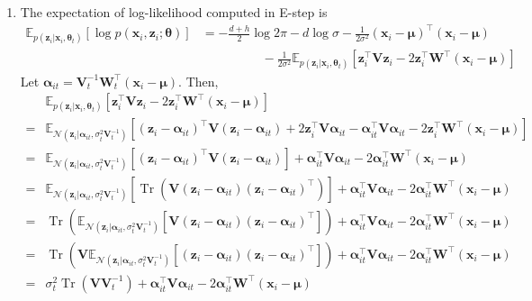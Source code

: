 \documentclass[11pt]{article}
\DeclareMathOperator{\tr}{Tr}
\begin{document}
\begin{enumerate}
\begin{enumerate}
    \item
    The expectation of log-likelihood computed in E-step is
    \begin{align*}
    \mathbb{E}_{p(\bm z_i|\bm x_i,\bm\theta_t)}[\log p(\bm x_i,\bm z_i;\bm\theta)]
    &= -\frac{d+h}{2}\log 2\pi-d\log\sigma-\frac{1}{2\sigma^2}(\bm x_i-\bm\mu)^{\top}(\bm x_i-\bm\mu) \\
    &\hspace{2cm} -\frac{1}{2\sigma^2}\mathbb{E}_{p(\bm z_i|\bm x_i,\bm\theta_t)}\left[\bm z_i^{\top}\bm V\bm z_i-2\bm z_i^{\top}\bm W^{\top}(\bm x_i-\bm\mu)\right]
    \end{align*}
    Let $\bm\alpha_{it}=\bm V_t^{-1}\bm W_t^{\top}(\bm x_i-\bm\mu)$. Then,
    \begin{align*}
    & \mathbb{E}_{p(\bm z_i|\bm x_i,\bm\theta_t)}\left[\bm z_i^{\top}\bm V\bm z_i-2\bm z_i^{\top}\bm W^{\top}(\bm x_i-\bm\mu)\right] \\
    =& \mathbb{E}_{\mathcal{N}(\bm z_i|\bm\alpha_{it},\sigma_t^2\bm V_t^{-1})}\left[(\bm z_i-\bm\alpha_{it})^{\top}\bm V(\bm z_i-\bm\alpha_{it})+2\bm z_i^{\top}\bm V\bm\alpha_{it}-\bm\alpha_{it}^{\top}\bm V\bm\alpha_{it}-2\bm z_i^{\top}\bm W^{\top}(\bm x_i-\bm\mu)\right] \\
    =& \mathbb{E}_{\mathcal{N}(\bm z_i|\bm\alpha_{it},\sigma_t^2\bm V_t^{-1})}\left[(\bm z_i-\bm\alpha_{it})^{\top}\bm V(\bm z_i-\bm\alpha_{it})\right]+\bm\alpha_{it}^{\top}\bm V\bm\alpha_{it}-2\bm\alpha_{it}^{\top}\bm W^{\top}(\bm x_i-\bm\mu) \\
    =& \mathbb{E}_{\mathcal{N}(\bm z_i|\bm\alpha_{it},\sigma_t^2\bm V_t^{-1})}\left[\tr\left(\bm V(\bm z_i-\bm\alpha_{it})(\bm z_i-\bm\alpha_{it})^{\top}\right)\right]+\bm\alpha_{it}^{\top}\bm V\bm\alpha_{it}-2\bm\alpha_{it}^{\top}\bm W^{\top}(\bm x_i-\bm\mu) \\
    =& \tr\left(\mathbb{E}_{\mathcal{N}(\bm z_i|\bm\alpha_{it},\sigma_t^2\bm V_t^{-1})}\left[\bm V(\bm z_i-\bm\alpha_{it})(\bm z_i-\bm\alpha_{it})^{\top}\right]\right)+\bm\alpha_{it}^{\top}\bm V\bm\alpha_{it}-2\bm\alpha_{it}^{\top}\bm W^{\top}(\bm x_i-\bm\mu) \\
    =& \tr\left(\bm V\mathbb{E}_{\mathcal{N}(\bm z_i|\bm\alpha_{it},\sigma_t^2\bm V_t^{-1})}\left[(\bm z_i-\bm\alpha_{it})(\bm z_i-\bm\alpha_{it})^{\top}\right]\right)+\bm\alpha_{it}^{\top}\bm V\bm\alpha_{it}-2\bm\alpha_{it}^{\top}\bm W^{\top}(\bm x_i-\bm\mu) \\
    =& \sigma_t^2\tr\left(\bm V\bm V_t^{-1}\right)+\bm\alpha_{it}^{\top}\bm V\bm\alpha_{it}-2\bm\alpha_{it}^{\top}\bm W^{\top}(\bm x_i-\bm\mu)

\end{align*}
\end{enumerate}
\end{enumerate}
\end{document}
